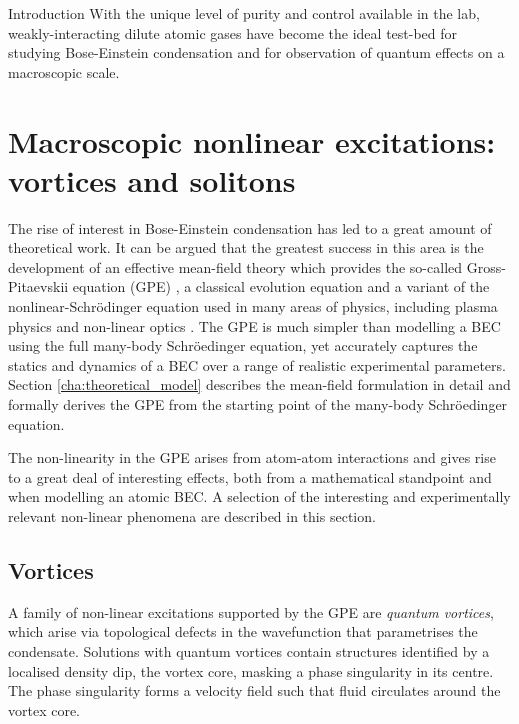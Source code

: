 \begin{chapter}{\label{cha:bose_gases}Introduction}
With the unique level of purity and control available in the lab, weakly-interacting dilute atomic gases have become the ideal test-bed for studying Bose-Einstein condensation and for observation of quantum effects on a macroscopic scale.


\section{Macroscopic nonlinear excitations: vortices and solitons}
The rise of interest in Bose-Einstein condensation has led to a great amount of theoretical work. It can be argued that the greatest success in this area is the development of an effective mean-field theory which provides the so-called Gross-Pitaevskii equation (GPE) \cite{Pethick,Pitaevskii61,Gross61,RevModPhys.71.463}, a classical evolution equation and a variant of the nonlinear-Schr\"odinger equation used in many areas of physics, including plasma physics \cite{PhysRevLett.37.693} and non-linear optics \cite{PhysRevA.65.053614,borisSolitons}. The GPE is much simpler than modelling a BEC using the full many-body Schr\"oedinger equation, yet accurately captures the statics and dynamics \cite{RevModPhys.71.463,Denschlag97, Burger99, PhysRevLett.86.2926, Dutton27072001,vortices,lobo_2004,PhysRevLett.85.2857} of a BEC over a range of realistic experimental parameters. Section \ref{cha:theoretical_model} describes the mean-field formulation  in detail and formally derives the GPE from the starting point of the many-body Schr\"oedinger equation.

The non-linearity in the GPE arises from atom-atom interactions and gives rise to a great deal of interesting effects, both from a mathematical standpoint and when modelling an atomic BEC. A selection of the interesting and experimentally relevant non-linear phenomena are described in this section.

\subsection{Vortices}
A family of non-linear excitations supported by the GPE are {\it quantum vortices}, which arise via topological defects in the wavefunction that parametrises the condensate. Solutions with quantum vortices contain structures identified by a localised density dip, the vortex core, masking a phase singularity in its centre. The phase singularity forms a velocity field such that fluid circulates around the vortex core.


\end{chapter}
